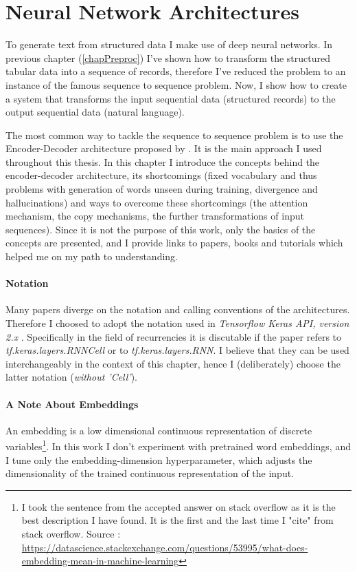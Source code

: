 \chapter{Neural Network Architectures} \label{neural_nets_chapter}
To generate text from structured data I make use of deep neural networks. In previous chapter (\ref{chapPreproc}) I've shown how to transform the structured tabular data into a sequence of records, therefore I've reduced the problem to an instance of the famous sequence to sequence problem. Now, I show how to create a system that transforms the input sequential data (structured records) to the output sequential data (natural language).

The most common way to tackle the sequence to sequence problem is to use the Encoder-Decoder architecture proposed by \citep{sutskever2014sequence}. It is the main approach I used throughout this thesis. In this chapter I introduce the concepts behind the encoder-decoder architecture, its shortcomings (fixed vocabulary and thus problems with generation of words unseen during training, divergence and hallucinations) and ways to overcome these shortcomings (the attention mechanism, the copy mechanisms, the further transformations of input sequences). Since it is not the purpose of this work, only the basics of the concepts are presented, and I provide links to papers, books and tutorials which helped me on my path to understanding.

\subsubsection{Notation}
Many papers diverge on the notation and calling conventions of the architectures. Therefore I choosed to adopt the notation used in \emph{Tensorflow Keras API, version 2.x} \citep{tensorflow2015-whitepaper}. Specifically in the field of recurrencies it is discutable if the paper refers to \emph{tf.keras.layers.RNNCell} or to \emph{tf.keras.layers.RNN}. I believe that they can be used interchangeably in the context of this chapter, hence I (deliberately) choose the latter notation (\emph{without 'Cell'}).

\subsubsection{A Note About Embeddings}

An embedding is a low dimensional continuous representation of discrete variables\footnote{I took the sentence from the accepted answer on stack overflow as it is the best description I have found. It is the first and the last time I "cite" from stack overflow. Source : \url{https://datascience.stackexchange.com/questions/53995/what-does-embedding-mean-in-machine-learning}}. In this work I don't experiment with pretrained word embeddings, and I tune only the embedding-dimension hyperparameter, which adjusts the dimensionality of the trained continuous representation of the input.

